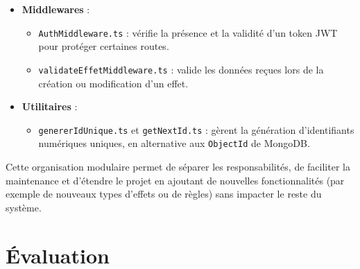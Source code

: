 \documentclass[12pt]{article}        %
\begin{document}
\begin{itemize}
    \item \textbf{Middlewares} :
    \begin{itemize}
        \item \texttt{AuthMiddleware.ts} : vérifie la présence et la validité d’un token JWT pour protéger certaines routes.
        \item \texttt{validateEffetMiddleware.ts} : valide les données reçues lors de la création ou modification d’un effet.
    \end{itemize}
    \item \textbf{Utilitaires} :
    \begin{itemize}
        \item \texttt{genererIdUnique.ts} et \texttt{getNextId.ts} : gèrent la génération d’identifiants numériques uniques,
         en alternative aux \texttt{ObjectId} de MongoDB.
    \end{itemize}
\end{itemize}

Cette organisation modulaire permet de séparer les responsabilités, de faciliter la maintenance et d’étendre le projet
 en ajoutant de nouvelles fonctionnalités (par exemple de nouveaux types d’effets ou de règles) sans impacter le reste du système.



\section{Évaluation}
\label{sec:Evaluation}
\end{document}
